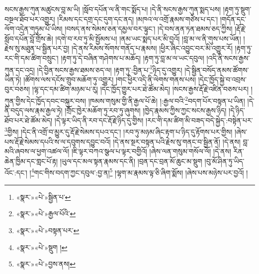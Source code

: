 སངས་རྒྱས་ཀུན་མཚུངས་བླ་མ་ཡི། །སློབ་དཔོན་ལ་ནི་གང་སྨོད་པ། །དེ་ནི་སངས་རྒྱས་ཀུན་སྨད་པས། །རྟག་ཏུ་སྡུག་བསྔལ་ཐོབ་པར་འགྱུར། །རིམས་དང་དགྲ་དང་དུག་དང་ནད། །མཁའ་ལ་འགྲོ་རྣམས་གཙེས་པ་དང་། །གདོན་དང་ལོག་འདྲེན་གཏུམ་པོ་ཡིས། །བསད་ནས་སེམས་ཅན་དམྱལ་བར་ལྟུང་། །དེ་བས་ནན་ཏན་ཐམས་ཅད་ཀྱིས། །རྡོ་རྗེ་སློབ་དཔོན་བློ་གྲོས་ཆེ། །དགེ་བ་རབ་ཏུ་མི་སྤྱོམས་པ། །ནམ་ཡང་སྨད་པར་མི་བྱའོ། །བླ་མ་ལ་ནི་གུས་པས་ཡོན། །རྗེས་སུ་མཐུན་པ་སྦྱིན་པར་བྱ། །དེ་ནས་རིམས་སོགས་གནོད་པ་རྣམས། །ཕྱིར་ཞིང་འབྱུང་བར་མི་འགྱུར་རོ། །རྟག་ཏུ་རང་གི་དམ་ཚིག་བསྲུང་། །རྟག་ཏུ་དེ་བཞིན་གཤེགས་པ་མཆོད། །རྟག་ཏུ་བླ་མ་ལ་ཡང་དབུལ། །འདི་ནི་སངས་རྒྱས་ཀུན་དང་འདྲ། །དེ་བྱིན་སངས་རྒྱས་ཐམས་ཅད་ལ། །རྟག་ཏུ་:བྱིན་པ་\footnote{«སྣར་»«པེ་»སྦྱིན་པ་}ཉིད་དུ་འགྱུར། །དེ་སྦྱིན་བསོད་ནམས་ཚོགས་ཡིན་ཏེ། །ཚོགས་ལས་དངོས་གྲུབ་མཆོག་ཏུ་འགྱུར། །གང་ཕྱིར་འདི་ནི་ལེགས་གནས་པས། །དེང་ཁྱོད་སྐྱེ་བ་འབྲས་བུར་བཅས། །ལྷ་དང་དམ་ཚིག་མཉམ་པ་རུ། །དེང་ཁྱོད་གྱུར་པར་ཐེ་ཚོམ་མེད། །སངས་རྒྱས་རྡོ་རྗེ་འཛིན་བཅས་པར། །ཀུན་གྱིས་དེང་ཁྱོད་དབང་བསྐུར་བས། །ཁམས་གསུམ་གྱི་ནི་རྒྱལ་པོ་ཆེ། །:རྒྱལ་བའི་\footnote{«སྣར་»«པེ་»རྒྱལ་པོའི་}བདག་པོར་བསྟན་པ་ཡིན། །དེ་ནི་བདུད་ལས་རྣམ་རྒྱལ་ཏེ། །གྲོང་ཁྱེར་མཆོག་ཏུ་རབ་ཏུ་ཞུགས། །ཁྱེད་རྣམས་ཀྱིས་ཀྱང་སངས་རྒྱས་ཉིད། །དེ་ཉིད་ཐོབ་པར་ཐེ་ཚོམ་མེད། །དེ་ལྟར་ཡིད་ནི་རབ་དང་རྡོ་རྗེ་ཉིད་དུ་གྱིས། །རང་གི་དམ་ཚིག་མི་བཟད་བདེ་སྐྱེད་:བསྟེན་པར་\footnote{«སྣར་»«པེ་»བསྟན་པར་}གྱིས། །དེང་ནི་འགྲོ་བ་མྱུར་དུ་རྡོ་རྗེ་སེམས་དཔའ་དང་། །རབ་ཏུ་མཉམ་ཞིང་རྟག་པ་ཉིད་དུ་རྟོགས་པར་གྱིས། །ཞེས་པས་རྡོ་རྗེ་སེམས་དཔའི་ས་ལ་དབུགས་དབྱུང་བའོ། །དེ་ནས་སྔར་བསྟན་པའི་རྗེས་སུ་གནང་བ་སྦྱིན་ནོ། །དེ་ནས། བླ་མའི་ཞབས་ལ་ཕྱག་འཚལ་ལོ། །ཇི་ལྟར་བཀའ་སྩལ་པ་ལྟར་བགྱིའོ། །ཞེས་ལན་གསུམ་གསོལ་ལོ། །དེ་ནས། རིན་ཆེན་ཁྱིམ་དང་གླང་པོ་རྟ། །ཡུལ་དང་མལ་སྟན་རྣམས་དང་ནི། །བྲན་དང་བྲན་མོ་ཆུང་མ་སྡུག །བུ་མོ་ཤིན་ཏུ་ཡིད་འོང་:དང་། །\footnote{«སྣར་»«པེ་»སྡུག །}གང་གིས་བདག་ཀྱང་དབུལ་:བྱ་ན།\footnote{«སྣར་»«པེ་»བྱས་ནས།} །ལྷག་མ་རྣམས་ལྟ་ཅི་ཞིག་སྨོས། །ཞེས་པས་མཉེས་པར་བྱའོ། །
